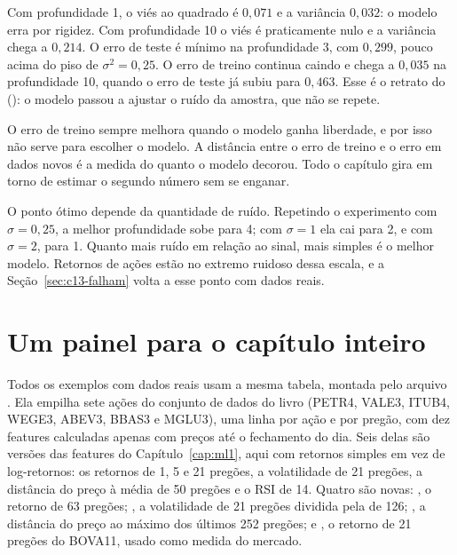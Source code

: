 Com profundidade 1, o viés ao quadrado é $0,071$ e a variância $0,032$: o modelo erra por rigidez. Com profundidade 10 o viés é praticamente nulo e a variância chega a $0,214$. O erro de teste é mínimo na profundidade 3, com $0,299$, pouco acima do piso de $\sigma^2 = 0,25$. O erro de treino continua caindo e chega a $0,035$ na profundidade 10, quando o erro de teste já subiu para $0,463$. Esse é o retrato do  (): o modelo passou a ajustar o ruído da amostra, que não se repete.

\begin{intuicao}
O erro de treino sempre melhora quando o modelo ganha liberdade, e por isso não serve para escolher o modelo. A distância entre o erro de treino e o erro em dados novos é a medida do quanto o modelo decorou. Todo o capítulo gira em torno de estimar o segundo número sem se enganar.
\end{intuicao}

O ponto ótimo depende da quantidade de ruído. Repetindo o experimento com $\sigma = 0,25$, a melhor profundidade sobe para 4; com $\sigma = 1$ ela cai para 2, e com $\sigma = 2$, para 1. Quanto mais ruído em relação ao sinal, mais simples é o melhor modelo. Retornos de ações estão no extremo ruidoso dessa escala, e a Seção~\ref{sec:c13-falham} volta a esse ponto com dados reais.

\section{Um painel para o capítulo inteiro}
\label{sec:c13-painel}

Todos os exemplos com dados reais usam a mesma tabela, montada pelo arquivo . Ela empilha sete ações do conjunto de dados do livro (PETR4, VALE3, ITUB4, WEGE3, ABEV3, BBAS3 e MGLU3), uma linha por ação e por pregão, com dez features calculadas apenas com preços até o fechamento do dia. Seis delas são versões das features do Capítulo~\ref{cap:ml1}, aqui com retornos simples em vez de log-retornos: os retornos de 1, 5 e 21 pregões, a volatilidade de 21 pregões, a distância do preço à média de 50 pregões e o RSI de 14. Quatro são novas: , o retorno de 63 pregões; , a volatilidade de 21 pregões dividida pela de 126; , a distância do preço ao máximo dos últimos 252 pregões; e , o retorno de 21 pregões do BOVA11, usado como medida do mercado.



